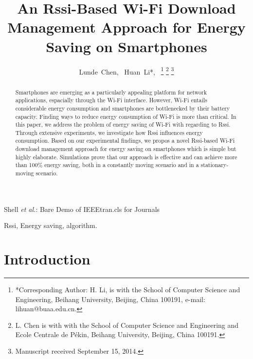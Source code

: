 \documentclass[journal]{IEEEtran}
\begin{document}
%
\title{An Rssi-Based Wi-Fi Download Management Approach for Energy Saving on Smartphones}
%
\author{Lunde~Chen,
        ~Huan~Li*,~%
\thanks{*Corresponding Author: H. Li,  is with the School
of Computer Science and Engineering, Beihang University, Beijing,
China 100191,  e-mail: lihuan@buaa.edu.cn.}%
\thanks{L. Chen is with with the School of Computer Science and Engineering and Ecole Centrale de P\'{e}kin, Beihang University, Beijing, China 100191.}%
\thanks{Manuscript received September 15, 2014.}}

{Shell \MakeLowercase{\textit{et al.}}: Bare Demo of IEEEtran.cls for Journals}

\maketitle

\begin{abstract}
Smartphones are emerging as a particularly appealing platform for network applications, 
espacially through the Wi-Fi interface. However,
Wi-Fi entails considerable energy consumption and smartphones
are bottlenecked by their battery capacity. Finding ways to reduce 
energy consumption of Wi-Fi is more than critical.
In this paper, we address the problem of energy saving of Wi-Fi 
with regarding to Rssi. Through extensive experiments, we investigate how 
Rssi influences energy consumption. Based on our experimental findings, 
we propos a novel Rssi-based Wi-Fi download management approach for energy saving on smartphones
which is simple but highly elaborate.
Simulations prove that our approach is effective and can achieve more than 100\% energy saving, 
both in a constantly moving scenario and in a stationary-moving scenario.
\end{abstract}

\begin{IEEEkeywords}
Rssi, Energy saving, algorithm.
\end{IEEEkeywords}

\IEEEpeerreviewmaketitle

\section{Introduction}
\end{document}
